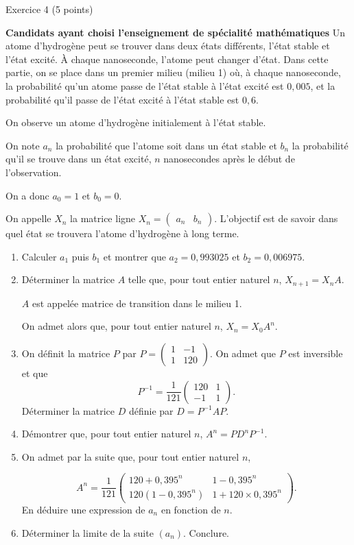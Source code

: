 
\begin{h2}Exercice 4 (5 points)\end{h2}
\textbf{Candidats ayant  choisi l'enseignement de spécialité \og mathématiques \fg{} }
\medbreak
Un atome d'hydrogène peut se trouver dans deux états différents, l'état stable et l'état excité. À chaque nanoseconde, l'atome peut changer d'état.
\bigbreak
{}
\medbreak
Dans cette partie, on se place dans un premier milieu (milieu 1) où, à chaque nanoseconde, la probabilité qu'un atome passe de l'état stable à l'état excité est $0,005$, et la probabilité qu'il passe de l'état excité à l'état stable est $0,6$.
\par
On observe un atome d'hydrogène initialement à l'état stable.
\par
On note $a_n$ la probabilité que l'atome soit dans un état stable et $b_n$ la probabilité qu'il se trouve dans un état excité, $n$ nanosecondes après le début de l'observation.
\par
On a donc $a_0 = 1$ et $b_0 = 0$.
\par
On appelle $X_n$ la matrice ligne $X_n = \begin{pmatrix}a_n& b_n\end{pmatrix}$.
L'objectif est de savoir dans quel état se trouvera l'atome d'hydrogène à long terme.
\medbreak
\begin{enumerate}
     \item Calculer $a_1$ puis $b_1$ et montrer que $a_2 = 0,993025$ et $b_2 = 0,006975$.
     \item Déterminer la matrice $A$ telle que, pour tout entier naturel $n$,\: $X_{n+1} = X_n A$.
     \par
     $A$ est appelée matrice de transition dans le milieu 1.
     \par
     On admet alors que, pour tout entier naturel $n$,\: $X_n = X_0A^n$.
     \item On définit la matrice $P$ par $P = \begin{pmatrix}1&-1\\ 1&120\end{pmatrix}$.
     On admet que $P$ est inversible et que
     \[P^{-1} = \dfrac{1}{121}\begin{pmatrix}120&1\\- 1&1\end{pmatrix}.\]
     Déterminer la matrice $D$ définie par $D = P^{-1} AP$.
     \item Démontrer que, pour tout entier naturel $n$,\: $A^n = P D^n P^{-1}$.
     \item On admet par la suite que, pour tout entier naturel $n$,
     \par
     \[A^n = \dfrac{1}{121}\begin{pmatrix}120 + 0,395^n&1 - 0,395^n\\120\left(1 - 0,395^n\right)&1 + 120 \times 0,395^n\end{pmatrix}.\]
     En déduire une expression de $a_n$ en fonction de $n$.
     \item Déterminer la limite de la suite $\left(a_n\right)$. Conclure.
\end{enumerate}
